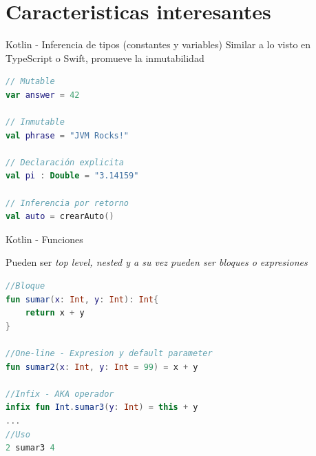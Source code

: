 \documentclass[aspectratio=169]{beamer}
\begin{document}
{
    \section{Caracteristicas interesantes}
}


\begin{frame}[fragile]{Kotlin - Inferencia de tipos (constantes y variables)}
Similar a lo visto en TypeScript o Swift, promueve la inmutabilidad
\begin{lstlisting}[language=Kotlin]
// Mutable
var answer = 42

// Inmutable
val phrase = "JVM Rocks!"

// Declaración explicita
val pi : Double = "3.14159"

// Inferencia por retorno
val auto = crearAuto()
\end{lstlisting}

\end{frame}

\begin{frame}[fragile]{Kotlin - Funciones}

Pueden ser \textit{top level, nested y a su vez pueden ser bloques o expresiones}
\begin{lstlisting}[language=Kotlin]
//Bloque
fun sumar(x: Int, y: Int): Int{
    return x + y
}

//One-line - Expresion y default parameter
fun sumar2(x: Int, y: Int = 99) = x + y

//Infix - AKA operador
infix fun Int.sumar3(y: Int) = this + y
...
//Uso
2 sumar3 4
\end{lstlisting}

\end{frame}
\end{document}
